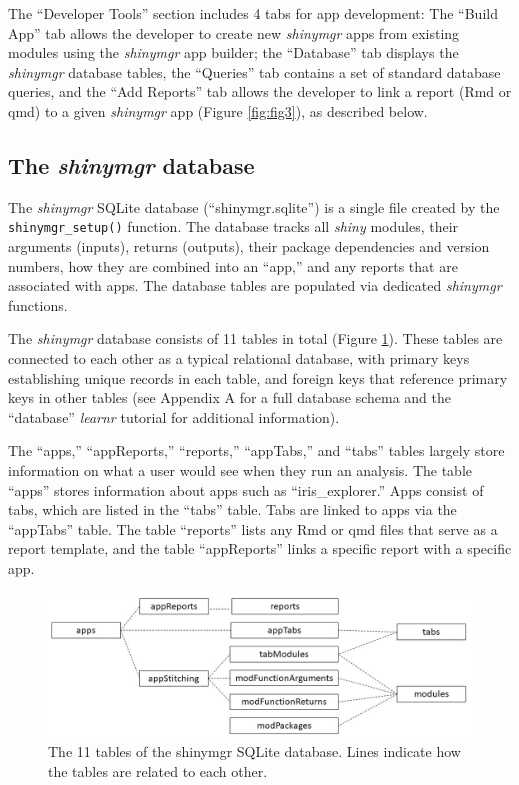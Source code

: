 The ``Developer Tools'' section includes 4 tabs for app development: The ``Build App'' tab allows the developer to create new \emph{shinymgr} apps from existing modules using the \emph{shinymgr} app builder; the ``Database'' tab displays the \emph{shinymgr} database tables, the ``Queries'' tab contains a set of standard database queries, and the ``Add Reports'' tab allows the developer to link a report (Rmd or qmd) to a given \emph{shinymgr} app (Figure \ref{fig:fig3}), as described below.

\subsection{\texorpdfstring{The \emph{shinymgr} database}{The shinymgr database}}\label{the-shinymgr-database}

The \emph{shinymgr} SQLite database (``shinymgr.sqlite'') is a single file created by the \texttt{shinymgr\_setup()} function. The database tracks all \emph{shiny} modules, their arguments (inputs), returns (outputs), their package dependencies and version numbers, how they are combined into an ``app,'' and any reports that are associated with apps. The database tables are populated via dedicated \emph{shinymgr} functions.

The \emph{shinymgr} database consists of 11 tables in total (Figure \ref{fig:fig4}). These tables are connected to each other as a typical relational database, with primary keys establishing unique records in each table, and foreign keys that reference primary keys in other tables (see Appendix A for a full database schema and the ``database'' \emph{learnr} tutorial for additional information).

The ``apps,'' ``appReports,'' ``reports,'' ``appTabs,'' and ``tabs'' tables largely store information on what a user would see when they run an analysis. The table ``apps'' stores information about apps such as ``iris\_explorer.'' Apps consist of tabs, which are listed in the ``tabs'' table. Tabs are linked to apps via the ``appTabs'' table. The table ``reports'' lists any Rmd or qmd files that serve as a report template, and the table ``appReports'' links a specific report with a specific app.

\begin{figure}[b]
\includegraphics[width=1\linewidth]{images/figure4} \caption{The 11 tables of the shinymgr SQLite database. Lines indicate how the tables are related to each other.}\label{fig:fig4}
\end{figure}

